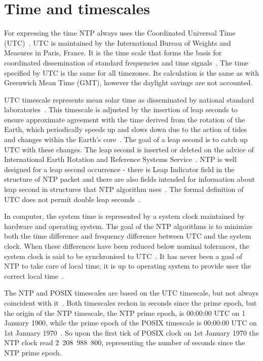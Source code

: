 
\section{Time and timescales}\label{sec:ntp-time}
For expressing the time NTP always uses the Coordinated Universal Time (UTC)~\cite{rfc5905}.
UTC is maintained by the International Bureau of Weights and Measures in Paris, France.
It is the time scale that forms the basis for coordinated dissemination
of standard frequencies and time signals~\cite{bipm-utc}.
The time specified by UTC is the same for all timezones.
Its calculation is the same as with Greenwich Mean Time (GMT),
however the daylight savings are not accounted.

UTC timescale represents mean solar time as disseminated by national
standard laboratories~\cite{rfc5905}.
This timescale is adjusted by the insertion of leap seconds to ensure approximate
agreement with the time derived from the rotation of the Earth,
which periodically speeds up and slows down due to the action
of tides and changes within the Earth's core~\cite{bipm-utc}.
The goal of a leap second is to catch up UTC with these changes.
The leap second is inserted or deleted on the advice of
International Earth Rotation and Reference Systems Service~\cite{bipm-utc}.
NTP is well designed for a leap second occurrence -
there is Leap Indicator field
in the structure of NTP packet and there are also fields intended for
information about leap second in structures that NTP algorithm uses~\cite{rfc5905}.
The formal definition of UTC does not permit double leap seconds~\cite{posix}.

In computer, the system time is represented by a system clock maintained by
hardware and operating system.
The goal of the NTP algorithms is to minimize
both the time difference and frequency difference between UTC and the system clock.
When these differences have been reduced below nominal
tolerances, the system clock is said to be synchronised to UTC~\cite{rfc5905}.
It has never been a goal of NTP to take care of local time,
it is up to operating system to provide user the correct local time~\cite{ntp-overview}.

The NTP and POSIX timescales are based on the UTC timescale,
but not always coincident with it~\cite{ntp-leap}.
Both timescales reckon in seconds since the prime epoch,
but the origin of the NTP timescale, the NTP prime epoch, is 00:00:00 UTC on 1 January 1900,
while the prime epoch of the POSIX timescale is 00:00:00 UTC on 1st January 1970~\cite{ntp-leap}.
So upon the first tick of POSIX clock on 1st January 1970 the NTP clock read 2~208~988~800,
representing the number of seconds since the NTP prime epoch.

